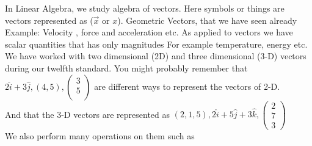 \documentclass{article}
\begin{document}
In Linear Algebra, we study algebra of vectors. Here symbols or things are vectors represented as ($\overrightarrow{x}$ or \textbf{$x$}). Geometric Vectors, that we have seen already
Example: Velocity , force  and  acceleration  etc.
As applied  to vectors  we  have  scalar  quantities that has only magnitudes For example temperature,  energy etc.\\
We have worked with two dimensional (2D) and three dimensional (3-D) vectors during our twelfth standard. You might probably remember that $2\hat{i}+3\hat{j}, (4,5),
        \begin{pmatrix}
         3 \\
         5 \\
       \end{pmatrix}
        $ are different ways to represent the vectors of 2-D.\\
        And that the 3-D vectors are represented as
        $(2,1,5), 2\hat{i}+5\hat{j}+3\hat{k},
          \begin{pmatrix}
          2\\
          7\\
          3
          \end{pmatrix}
         $\\
We also perform many operations on them such as
\end{document}
